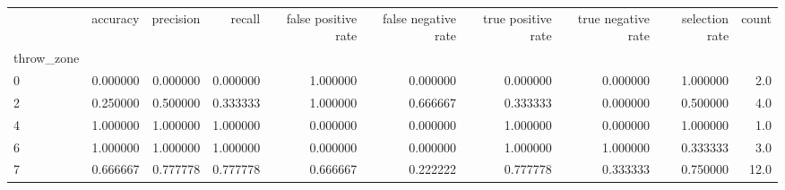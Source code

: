 \begin{tabular}{lrrrrrrrrr}
\toprule
{} &  accuracy &  precision &    recall &  false positive rate &  false negative rate &  true positive rate &  true negative rate &  selection rate &  count \\
throw\_zone &           &            &           &                      &                      &                     &                     &                 &        \\
\midrule
0          &  0.000000 &   0.000000 &  0.000000 &             1.000000 &             0.000000 &            0.000000 &            0.000000 &        1.000000 &    2.0 \\
2          &  0.250000 &   0.500000 &  0.333333 &             1.000000 &             0.666667 &            0.333333 &            0.000000 &        0.500000 &    4.0 \\
4          &  1.000000 &   1.000000 &  1.000000 &             0.000000 &             0.000000 &            1.000000 &            0.000000 &        1.000000 &    1.0 \\
6          &  1.000000 &   1.000000 &  1.000000 &             0.000000 &             0.000000 &            1.000000 &            1.000000 &        0.333333 &    3.0 \\
7          &  0.666667 &   0.777778 &  0.777778 &             0.666667 &             0.222222 &            0.777778 &            0.333333 &        0.750000 &   12.0 \\
\bottomrule
\end{tabular}
